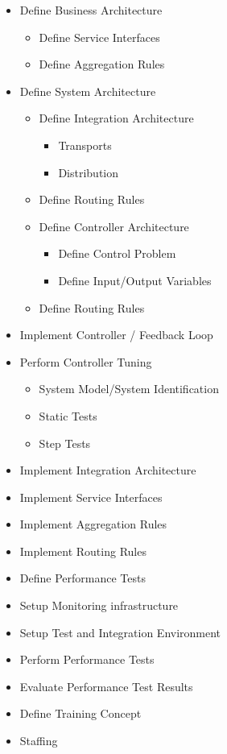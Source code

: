 \begin{itemize}
	\item Define Business Architecture
	\begin{itemize}
		\item Define Service Interfaces
		\item Define Aggregation Rules
	\end{itemize}
	\item Define System Architecture 
	\begin{itemize}
		\item Define Integration Architecture
		\begin{itemize}
			\item Transports
			\item Distribution
		\end{itemize}
		\item Define Routing Rules
		\item Define Controller Architecture 
		\begin{itemize}
			\item Define Control Problem 
			\item Define Input/Output Variables 
		\end{itemize}
		\item Define Routing Rules
	\end{itemize}
	\item Implement Controller / Feedback Loop
	\item Perform Controller Tuning 
	\begin{itemize}
		\item System Model/System Identification 
		\item Static Tests
		\item Step Tests
	\end{itemize}
	\item Implement Integration Architecture
	\item Implement Service Interfaces
	\item Implement Aggregation Rules 
	\item Implement Routing Rules
	\item Define Performance Tests 
	\item Setup Monitoring infrastructure
	\item Setup Test and Integration Environment
	\item Perform Performance Tests
	\item Evaluate Performance Test Results
	\item Define Training Concept
	\item Staffing
\end{itemize}

